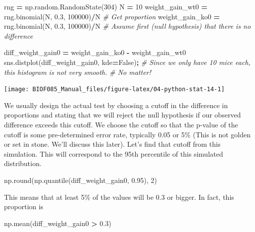 \documentclass[
  letterpaper,
]{scrbook}
\newenvironment{Shaded}{\begin{snugshade}}{\end{snugshade}}
\newcommand{\BuiltInTok}[1]{#1}
\newcommand{\CommentTok}[1]{\textcolor[rgb]{0.56,0.35,0.01}{\textit{#1}}}
\newcommand{\DecValTok}[1]{\textcolor[rgb]{0.00,0.00,0.81}{#1}}
\newcommand{\FloatTok}[1]{\textcolor[rgb]{0.00,0.00,0.81}{#1}}
\newcommand{\NormalTok}[1]{#1}
\newcommand{\OperatorTok}[1]{\textcolor[rgb]{0.81,0.36,0.00}{\textbf{#1}}}
\newcommand{\VariableTok}[1]{\textcolor[rgb]{0.00,0.00,0.00}{#1}}
\begin{document}
\begin{Shaded}
\begin{Highlighting}[]
\NormalTok{rng }\OperatorTok{=}\NormalTok{ np.random.RandomState(}\DecValTok{304}\NormalTok{)}
\NormalTok{N }\OperatorTok{=} \DecValTok{10}
\NormalTok{weight\_gain\_wt0 }\OperatorTok{=}\NormalTok{ rng.binomial(N, }\FloatTok{0.3}\NormalTok{, }\DecValTok{100000}\NormalTok{)}\OperatorTok{/}\NormalTok{N }\CommentTok{\# Get proportion}
\NormalTok{weight\_gain\_ko0 }\OperatorTok{=}\NormalTok{ rng.binomial(N, }\FloatTok{0.3}\NormalTok{, }\DecValTok{100000}\NormalTok{)}\OperatorTok{/}\NormalTok{N }\CommentTok{\# Assume first (null hypothesis) that there is no difference}

\NormalTok{diff\_weight\_gain0 }\OperatorTok{=}\NormalTok{ weight\_gain\_ko0 }\OperatorTok{{-}}\NormalTok{ weight\_gain\_wt0}
\NormalTok{sns.distplot(diff\_weight\_gain0, kde}\OperatorTok{=}\VariableTok{False}\NormalTok{)}\OperatorTok{;} \CommentTok{\# Since we only have 10 mice each, this histogram is not very smooth. }
                                           \CommentTok{\# No matter!}
\end{Highlighting}
\end{Shaded}

\begin{center}\texttt{[image: BIOF085\_Manual\_files/figure-latex/04-python-stat-14-1]} \end{center}

We usually design the actual test by choosing a cutoff in the difference in proportions and stating that we will reject the null hypothesis if our observed difference exceeds this cutoff. We choose the cutoff so that the p-value of the cutoff is some pre-determined error rate, typically 0.05 or 5\% (This is not golden or set in stone. We'll discuss this later). Let's find that cutoff from this simulation. This will correspond to the 95th percentile of this simulated distribution.

\begin{Shaded}
\begin{Highlighting}[]
\NormalTok{np.}\BuiltInTok{round}\NormalTok{(np.quantile(diff\_weight\_gain0, }\FloatTok{0.95}\NormalTok{), }\DecValTok{2}\NormalTok{)}
\end{Highlighting}
\end{Shaded}

This means that at least 5\% of the values will be 0.3 or bigger. In fact, this proportion is

\begin{Shaded}
\begin{Highlighting}[]
\NormalTok{np.mean(diff\_weight\_gain0 }\OperatorTok{\textgreater{}} \FloatTok{0.3}\NormalTok{)}
\end{Highlighting}
\end{Shaded}
\end{document}
